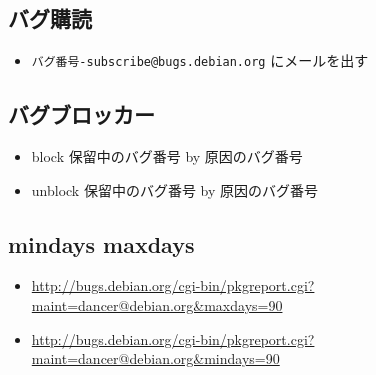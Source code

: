 \documentclass[cjk,dvipdfmx]{beamer}
\begin{document}
\subsection{バグ購読}

\begin{frame}
 \begin{itemize}
  \item {\tt バグ番号-subscribe@bugs.debian.org} にメールを出す
 \end{itemize}
\end{frame}

\subsection{バグブロッカー}

\begin{itemize}
 \item  block 保留中のバグ番号 by 原因のバグ番号
 \item  unblock 保留中のバグ番号 by 原因のバグ番号
\end{itemize}

\subsection{mindays maxdays}
\begin{itemize}
 \item \url{http://bugs.debian.org/cgi-bin/pkgreport.cgi?maint=dancer@debian.org&maxdays=90}
 \item \url{http://bugs.debian.org/cgi-bin/pkgreport.cgi?maint=dancer@debian.org&mindays=90}
\end{itemize}
\end{document}
